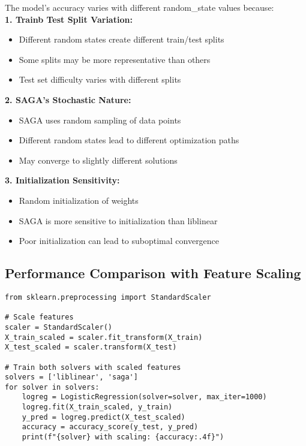 \documentclass[12pt]{article}
\begin{document}
The model's accuracy varies with different random\_state values because:\\

\textbf{1. Trainb Test Split Variation:}
\begin{itemize}
    \item Different random states create different train/test splits
    \item Some splits may be more representative than others
    \item Test set difficulty varies with different splits
\end{itemize}

\textbf{2. SAGA's Stochastic Nature:}
\begin{itemize}
    \item SAGA uses random sampling of data points
    \item Different random states lead to different optimization paths
    \item May converge to slightly different solutions
\end{itemize}

\textbf{3. Initialization Sensitivity:}
\begin{itemize}
    \item Random initialization of weights
    \item SAGA is more sensitive to initialization than liblinear
    \item Poor initialization can lead to suboptimal convergence
\end{itemize}

\subsection{Performance Comparison with Feature Scaling}

\begin{lstlisting}[caption={Comparing solvers with feature scaling}]
from sklearn.preprocessing import StandardScaler

# Scale features
scaler = StandardScaler()
X_train_scaled = scaler.fit_transform(X_train)
X_test_scaled = scaler.transform(X_test)

# Train both solvers with scaled features
solvers = ['liblinear', 'saga']
for solver in solvers:
    logreg = LogisticRegression(solver=solver, max_iter=1000)
    logreg.fit(X_train_scaled, y_train)
    y_pred = logreg.predict(X_test_scaled)
    accuracy = accuracy_score(y_test, y_pred)
    print(f"{solver} with scaling: {accuracy:.4f}")
\end{lstlisting}
\end{document}
